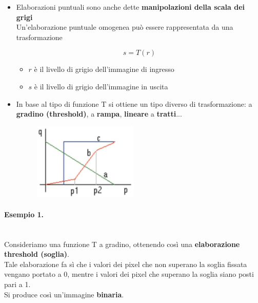 \begin{itemize}
    \item Elaborazioni puntuali sono anche dette \textbf{manipolazioni della scala dei
              grigi}\\
          Un'elaborazione puntuale omogenea può essere rappresentata da
          una trasformazione

          $$
              s = T(r)
          $$

          \begin{itemize}
              \item $r$ è il livello di grigio dell'immagine di ingresso
              \item $s$ è il livello di grigio dell'immagine in uscita
          \end{itemize}
    \item In base al tipo di funzione T si ottiene un tipo diverso di
          trasformazione: a \textbf{gradino (threshold)}, a \textbf{rampa},
          \textbf{lineare} a \textbf{tratti}...

          \begin{figure}[H]
              \centering
              \includegraphics[width=5cm, keepaspectratio]{capitoli/immagini/imgs/elaborazioni_puntuali_immagine.jpg}
          \end{figure}

\end{itemize}

\paragraph{Esempio 1.} \ \\

Consideriamo una funzione T a gradino, ottenendo così una
\textbf{elaborazione threshold (soglia)}.\\
Tale elaborazione fa sì che i valori dei pixel che non superano la
soglia fissata vengano portato a 0, mentre i valori dei pixel che
superano la soglia siano posti pari a 1.\\
Si produce così un'immagine \textbf{binaria}.

